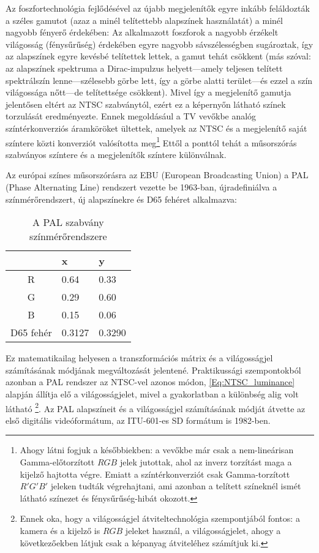 \vspace{3mm}
Az foszfortechnológia fejlődésével az újabb megjelenítők egyre inkább feláldozták a széles gamutot (azaz a minél telítettebb alapszínek használatát) a minél nagyobb fényerő érdekében: 
Az alkalmazott foszforok a nagyobb érzékelt világosság (fénysűrűség) érdekében egyre nagyobb sávszélességben sugároztak, így az alapszínek egyre kevésbé telítettek lettek, a gamut tehát csökkent (más szóval: az alapszínek spektruma a Dirac-impulzus helyett---amely teljesen telített spektrálszín lenne---szélesebb görbe lett, így a görbe alatti terület---és ezzel a szín világossága nőtt---de telítettsége csökkent).
Mivel így a megjelenítő gamutja jelentősen eltért az NTSC szabványtól, ezért ez a képernyőn látható színek torzulását eredményezte.
Ennek megoldásául a TV vevőkbe analóg színtérkonverziós áramköröket ültettek, amelyek az NTSC és a megjelenítő saját színtere közti konverziót valósította meg\footnote{Ahogy látni fogjuk a későbbiekben: a vevőkbe már csak a nem-lineárisan Gamma-előtorzított $RGB$ jelek jutottak, ahol az inverz torzítást maga a kijelző hajtotta végre. Emiatt a színtérkonverziót csak Gamma-torzított $R'G'B'$ jeleken tudták végrehajtani, ami azonban a telített színeknél ismét látható színezet és fénysűrűség-hibát okozott.}
Ettől a ponttól tehát a műsorszórás szabványos színtere és a megjelenítők színtere különválnak.

Az európai színes műsorszórásra az EBU (European Broadcasting Union) a PAL (Phase Alternating Line) rendszert vezette be 1963-ban, újradefiniálva a színmérőrendszert, új alapszínekre és D65 fehéret alkalmazva:
\begin{table}[h!]
\caption{A PAL szabvány színmérőrendszere}
\renewcommand*{\arraystretch}{1}
\label{tab:pal_colorimetry}
\begin{center}
\small\addtolength{\tabcolsep}{15pt}
    \begin{tabular}[h!]{ @{}c | | l | l @{} }%
		&   x  	&    y \\ \hline
    R   &  0.64 &  0.33 \\
    G   &  0.29 &  0.60  \\
    B   & 0.15 & 0.06\\
    D65 fehér     &  0.3127 & 0.3290 	  \\
    \end{tabular}
\end{center}
\end{table}
%
Ez matematikailag helyesen a transzformációs mátrix és a világosságjel számításának módjának megváltozását jelentené.
Praktikussági szempontokból azonban a PAL rendszer az NTSC-vel azonos módon, \eqref{Eq:NTSC_luminance} alapján állítja elő a világosságjelet, mivel a gyakorlatban a különbség alig volt látható \footnote{Ennek oka, hogy a világosságjel átviteltechnológia szempontjából fontos: a kamera és a kijelző is $RGB$ jeleket használ, a világosságjelet, ahogy a következőekben látjuk csak a képanyag átviteléhez számítjuk ki.}.
Az PAL alapszíneit és a világosságjel számításának módját átvette az első digitális videóformátum, az ITU-601-es SD formátum is 1982-ben.

